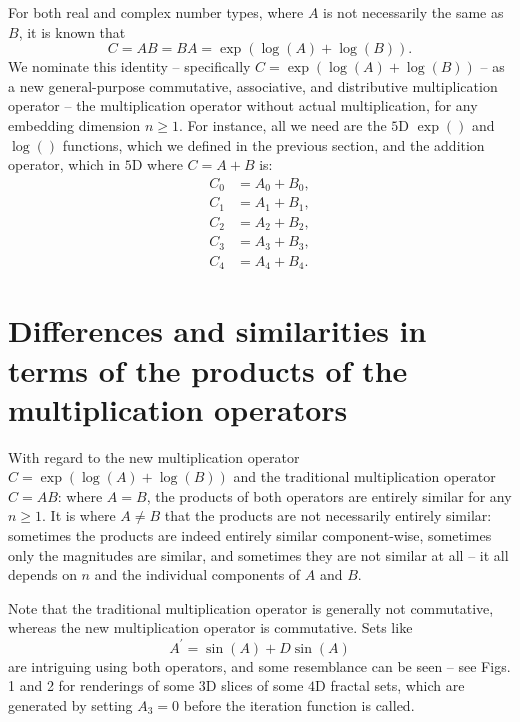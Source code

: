 \documentclass[12pt]{article}
\begin{document}
For both real and complex number types, where $A$ is not necessarily the same as $B$, it is known that 
\begin{equation}
C = A B = B A = \exp(\log(A) + \log(B)).
\end{equation}
We nominate this identity -- specifically $C = \exp(\log(A) + \log(B))$ -- as a new general-purpose commutative, associative, and distributive multiplication operator -- the multiplication operator without actual multiplication, for any embedding dimension $n \geq 1$.
For instance, all we need are the $5$D $\exp()$ and $\log()$ functions, which we defined in the previous section, and the addition operator, which in $5$D where $C = A + B$ is:
\begin{equation}
\begin{split}
C_0 &= A_0 + B_0, \\
C_1 &= A_1 + B_1, \\
C_2 &= A_2 + B_2, \\
C_3 &= A_3 + B_3, \\
C_4 &= A_4 + B_4.
\end{split}
\end{equation}








\section{Differences and similarities in terms of the products of the multiplication operators}

With regard to the new multiplication operator $C = \exp(\log(A) + \log(B))$ and the traditional multiplication operator $C = AB$: where $A = B$, the products of both operators are entirely similar for any $n \geq 1$.
It is where $A \neq B$ that the products are not necessarily entirely similar: sometimes the products are indeed entirely similar component-wise, sometimes only the magnitudes are similar, and sometimes they are not similar at all -- it all depends on $n$ and the individual components of $A$ and $B$.

Note that the traditional multiplication operator is generally not commutative, whereas the new multiplication operator is commutative.
Sets like 
\begin{equation}
A^{\prime} = \sin(A) + D \sin(A)
\end{equation}
are intriguing using both operators, and some resemblance can be seen -- see Figs. 1 and 2 for renderings of some $3$D slices of some $4$D fractal sets, which are generated by setting $A_3 = 0$ before the iteration function is called.
\end{document}
